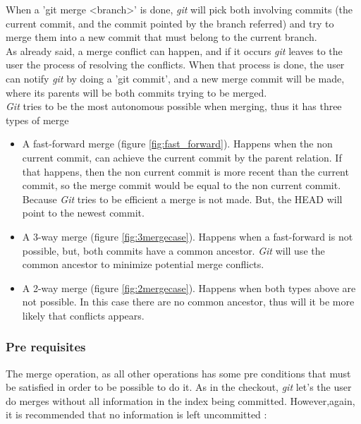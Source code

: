 When a 'git merge <branch>' is done, \emph{git} will pick both involving
commits (the current commit, and the commit pointed by the branch referred)
and try to merge them into a new commit that must belong to the current branch.
\\
As already said, a merge conflict can happen, and if it occurs \emph{git} leaves
to the user the process of resolving the conflicts. When that process is done,
the user can notify \emph{git} by doing a 'git commit', and a new merge commit 
will be made, where its parents will be both commits trying to be merged. \\
\emph{Git} tries to be the most autonomous possible when merging, thus it has
three types of merge

\begin{itemize}
\item A fast-forward merge (figure \ref{fig:fast_forward}). 
Happens when the non current commit, can achieve the current commit by the 
parent relation. If that happens, then the non current commit is more recent
than the current commit, so the merge commit would be equal to the non current
commit. Because \emph{Git} tries to be efficient a merge is not made. But, the
HEAD will point to the newest commit. 

\item A 3-way merge (figure \ref{fig:3mergecase}). 
Happens when a fast-forward is not possible, but, both commits have a common
ancestor. \emph{Git} will use the common ancestor to minimize potential
merge conflicts.

\item A 2-way merge (figure \ref{fig:2mergecase}). 
Happens when both types above are not possible. In this case there are no
common ancestor, thus will it be more likely that conflicts appears.

\end{itemize}

\subsubsection{Pre requisites}
The merge operation, as all other operations has some pre conditions that
must be satisfied in order to be possible to do it. As in the checkout,
\emph{git} let's the user do merges without all information in the index 
being committed. However,again, it is recommended that no information is 
left uncommitted :

